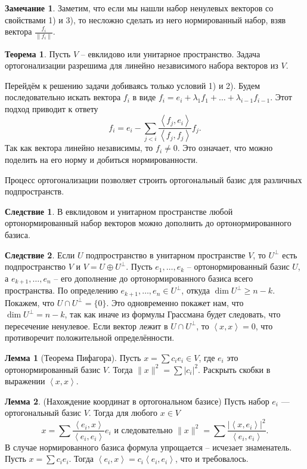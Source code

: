 \documentclass[10pt,a4paper,oneside]{book} %
\theoremstyle{definition}
\newtheorem*{rem}{Замечание}
\newtheorem{thm}{Теорема}
\newtheorem{lem}{Лемма}
\newtheorem{cor}{Следствие}
\def\lan{\left\langle }
\def\ran{\right\rangle}
\def\thrm{\begin{thm}}
\def\ethrm{\end{thm}}
\def\lm{\begin{lem}}
\def\elm{\end{lem}}
\def\crl{\begin{cor}}
\def\ecrl{\end{cor}}
\def\rm{\begin{rem}}
\def\erm{\end{rem}}
\begin{document}
\rm Заметим, что если мы нашли набор ненулевых векторов со свойствами 1) и 3), то несложно сделать из него нормированный набор, взяв вектора $\frac{f_i}{\|f_i\|}$. 
\erm

\thrm Пусть $V$ -- евклидово или унитарное пространство. Задача ортогонализации разрешима для линейно независимого набора векторов из $V$.
\proof

Перейдём к решению задачи добиваясь только условий 1) и 2). Будем последовательно искать вектора $f_i$ в виде $f_i=e_i+\lambda_1 f_1 +\dots + \lambda_{i-1} f_{i-1}$. Этот подход приводит к ответу
$$f_i=e_i-\sum_{j<i} \frac{\lan f_j,e_i\ran}{\lan f_j,f_j\ran}f_j.$$
Так как вектора линейно независимы, то $f_i\neq 0$. Это означает, что можно поделить на его норму и добиться нормированности.
\endproof
\ethrm


Процесс ортогонализации позволяет строить ортогональный базис для различных подпространств.

\crl В евклидовом и унитарном пространстве любой ортонормированный набор векторов можно дополнить до ортонормированного базиса.
\ecrl

\crl Если $U$ подпространство в унитарном пространстве $V$, то $U^{\bot}$ есть подпространство $V$ и  $V= U \oplus U^{\bot}$. 
\proof Пусть $e_1,\dots,e_k$ -- ортонормированный базис $U$, а $e_{k+1}, \dots, e_n$ -- его дополнение до ортонормированного базиса всего пространства. По определению $e_{k+1},\dots,e_n \in U^{\bot}$, откуда $\dim U^{\bot} \geq n-k$. Покажем, что $U\cap U^{\bot}=\{0\}$. Это одновременно покажет нам, что $\dim U^{\bot}=n-k$, так как иначе из формулы Грассмана будет следовать, что пересечение ненулевое.
Если вектор лежит в $U\cap U^{\bot}$, то $\lan x,x\ran=0$, что противоречит положительной определённости.
\endproof
\ecrl

\lm[Теорема Пифагора] Пусть $x= \sum c_i e_i \in V$, где $e_i$ это ортонормированный базис $V$. Тогда $\|x\|^2=\sum |c_i|^2$.
\proof Раскрыть скобки в выражении $\lan x,x\ran$.
\endproof
\elm

\lm(Нахождение координат в ортогональном базисе) Пусть набор $e_i$ --- ортогональный базис $V$. Тогда для любого $x\in V$ 
$$x= \sum \frac{\lan e_i,  x\ran}{\lan e_i, e_i\ran}e_i \text{ и следовательно  } \|x\|^2= \sum \frac{|\lan x, e_i\ran|^2}{\lan e_i, e_i\ran}.$$
 В случае нормированного базиса формула упрощается -- исчезает знаменатель.
\proof Пусть $x=\sum c_i e_i$. Тогда $\lan e_i, x\ran = c_i \lan e_i,e_i \ran$, что и требовалось.
\endproof
\elm
\end{document}

